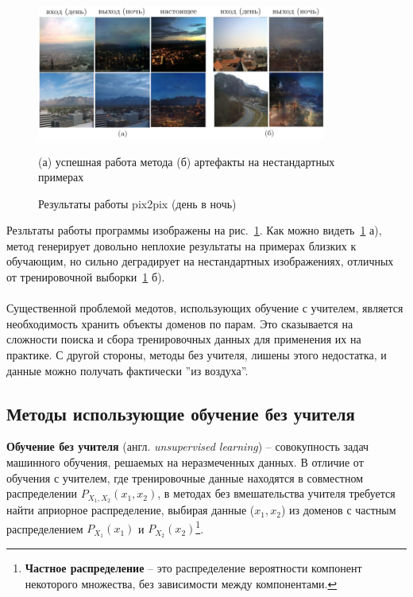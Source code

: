 \documentclass[11pt,a4paper]{extarticle}
\begin{document}
			\begin{figure}[ht]
				\centering
				\includegraphics[width=0.85\textwidth]{img/pix2pix_res}
				\caption{Результаты работы pix2pix (день в ночь)}{
					\small{
					(а) успешная работа метода
					(б) артефакты на нестандартных примерах
				}}
				\label{pic:pix2pix_results}
			\end{figure}
			\noindent
			Резльтаты работы программы изображены на рис.~\ref{pic:pix2pix_results}.
			Как можно видеть~\ref{pic:pix2pix_results} а), метод генерирует довольно неплохие результаты на примерах близких к обучающим,
			но сильно деградирует на нестандартных изображениях, отличных от тренировочной выборки~\ref{pic:pix2pix_results} б). 
			\\\\Существенной проблемой медотов, использующих обучение с учителем, является необходимость хранить объекты доменов по парам.
			Это сказывается на сложности поиска и сбора тренировочных данных для применения их на практике.
			С другой стороны, методы без учителя, лишены этого недостатка, и данные можно получать фактически ''из воздуха''.
			
			
	\subsection{Методы использующие обучение без учителя}

		\textbf{Обучение без учителя} (англ. \textit{unsupervised learning}) -- совокупность задач машинного обучения, решаемых на неразмеченных данных.
		В отличие от обучения с учителем, где тренировочные данные находятся в совместном распределении \(P_{X_{1},X_{2}}(x_{1},x_{2})\), в методах без вмешательства учителя требуется
		найти априорное распределение, выбирая данные (\(x_{1},x_{2}\)) из доменов с частным распределением \(P_{X_{1}}(x_{1})\) и  \(P_{X_{2}}(x_{2})\)\footnote{
			\textbf{Частное распределение} -- это распределение вероятности компонент некоторого множества, без зависимости между компонентами.
		}.
\end{document}
